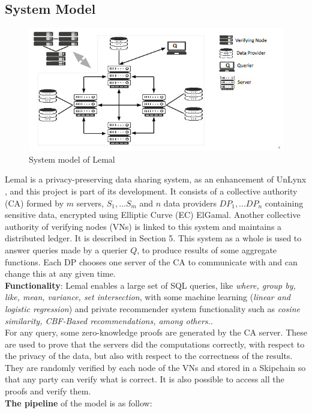\documentclass{article}
\begin{document}
\subsection{System Model}
\begin{figure}[H]
\center
\includegraphics[scale=0.75]{img/lemal.png}
\caption{System model of Lemal}
\end{figure}
Lemal is a privacy-preserving data sharing system, as an enhancement of UnLynx \cite{unlynx}, and this project is part of its development. It consists of a collective authority (CA) formed by $m$ servers, $S_1,...S_m$ and $n$ data providers $DP_1,...DP_n$ containing sensitive data, encrypted using Elliptic Curve (EC) ElGamal.
Another collective authority of verifying nodes (VNs) is linked to this system and maintains a distributed ledger. It is described in Section 5. This system as a whole is used to answer queries made by a querier $Q$, to produce results of some aggregate functions. Each DP chooses one server of the CA to communicate with and can change this at any given time.\\
\textbf{Functionality}: Lemal enables a large set of SQL queries, like \textit{where, group by, like, mean, variance, set intersection}, with some machine learning (\textit{linear and logistic regression}) and private recommender system functionality such as \textit{cosine similarity, CBF-Based recommendations, among others.}.\\
For any query, some zero-knowledge proofs are generated by the CA server. These are used to prove that the servers did the computations correctly, with respect to the privacy of the data, but also with respect to the correctness of the results. They are randomly verified by each node of the VNs and stored in a Skipchain so that any party can verify what is correct. It is also possible to access all the proofs and verify them.\\
\textbf{The pipeline} of the model is as follow:
\end{document}
